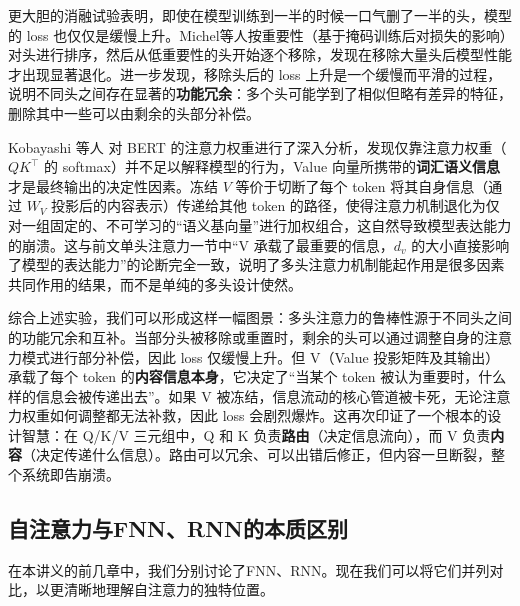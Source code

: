 更大胆的消融试验表明，即使在模型训练到一半的时候一口气删了一半的头，模型的 loss 也仅仅是缓慢上升\cite{michel2019sixteenheadsreallybetter}。Michel等人按重要性（基于掩码训练后对损失的影响）对头进行排序，然后从低重要性的头开始逐个移除，发现在移除大量头后模型性能才出现显著退化。进一步发现，移除头后的 loss 上升是一个缓慢而平滑的过程，说明不同头之间存在显著的\textbf{功能冗余}：多个头可能学到了相似但略有差异的特征，删除其中一些可以由剩余的头部分补偿。

Kobayashi 等人\cite{kobayashi2020attentionweightanalyzingtransformers} 对 BERT 的注意力权重进行了深入分析，发现仅靠注意力权重（$QK^\top$ 的 softmax）并不足以解释模型的行为，Value 向量所携带的\textbf{词汇语义信息}才是最终输出的决定性因素。冻结 $V$ 等价于切断了每个 token 将其自身信息（通过 $W_V$ 投影后的内容表示）传递给其他 token 的路径，使得注意力机制退化为仅对一组固定的、不可学习的“语义基向量”进行加权组合，这自然导致模型表达能力的崩溃。这与前文单头注意力一节中“V 承载了最重要的信息，$d_v$ 的大小直接影响了模型的表达能力”的论断完全一致，说明了多头注意力机制能起作用是很多因素共同作用的结果，而不是单纯的多头设计使然。

综合上述实验，我们可以形成这样一幅图景：多头注意力的鲁棒性源于不同头之间的功能冗余和互补。当部分头被移除或重置时，剩余的头可以通过调整自身的注意力模式进行部分补偿，因此 loss 仅缓慢上升。但 V（Value 投影矩阵及其输出）承载了每个 token 的\textbf{内容信息本身}，它决定了“当某个 token 被认为重要时，什么样的信息会被传递出去”。如果 V 被冻结，信息流动的核心管道被卡死，无论注意力权重如何调整都无法补救，因此 loss 会剧烈爆炸。这再次印证了一个根本的设计智慧：在 Q/K/V 三元组中，Q 和 K 负责\textbf{路由}（决定信息流向），而 V 负责\textbf{内容}（决定传递什么信息）。路由可以冗余、可以出错后修正，但内容一旦断裂，整个系统即告崩溃。

\subsection{自注意力与FNN、RNN的本质区别}

在本讲义的前几章中，我们分别讨论了FNN、RNN。现在我们可以将它们并列对比，以更清晰地理解自注意力的独特位置。

